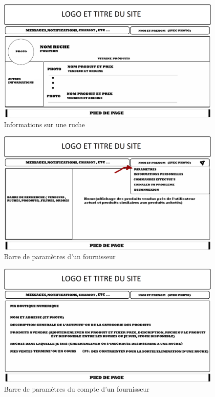 \documentclass[a4paper,12pt]{report}
\theoremstyle{break}
\theoremstyle{break}
\theoremstyle{break}
\theoremstyle{break}
\theoremstyle{definition}
\theoremstyle{remark}
\begin{document}
\begin{appendices}
\begin{figure}[!ht]
  \centering
  \includegraphics[scale=0.25]{images/storyboard/06.jpg}
  \caption{Informations sur une ruche}
\end{figure}

\begin{figure}[!ht]
  \centering
  \includegraphics[scale=0.25]{images/storyboard/07.jpg}
  \caption{Barre de paramètres d'un fournisseur}
\end{figure}

\begin{figure}[!ht]
  \centering
  \includegraphics[scale=0.25]{images/storyboard/08.jpg}
  \caption{Barre de paramètres du compte d'un fournisseur}
\end{figure}
\end{appendices}


\end{document}
